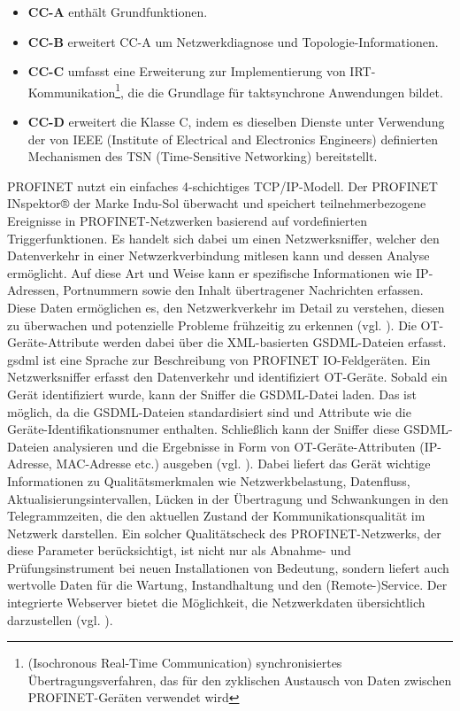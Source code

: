 \begin{itemize}
\item \textbf{CC-A} enthält Grundfunktionen.
\item \textbf{CC-B} erweitert CC-A um Netzwerkdiagnose und Topologie-Informationen.
\item \textbf{CC-C} umfasst eine Erweiterung zur Implementierung von IRT-Kommunikation\footnote{(Isochronous Real-Time Communication) synchronisiertes Übertragungsverfahren, das für den zyklischen Austausch von Daten zwischen PROFINET-Geräten verwendet wird}, die die Grundlage für taktsynchrone Anwendungen bildet.
\item \textbf{CC-D} erweitert die Klasse C, indem es dieselben Dienste unter Verwendung der von IEEE (Institute of Electrical and Electronics Engineers) definierten Mechanismen des TSN (Time-Sensitive Networking) bereitstellt.
\end{itemize} PROFINET nutzt ein einfaches 4-schichtiges TCP/IP-Modell. Der PROFINET INspektor® der Marke Indu-Sol überwacht und speichert teilnehmerbezogene Ereignisse in PROFINET-Netzwerken basierend auf vordefinierten Triggerfunktionen. Es handelt sich dabei um einen Netzwerksniffer, welcher den Datenverkehr in einer Netwzerkverbindung mitlesen kann und dessen Analyse ermöglicht.  Auf diese Art und Weise kann er spezifische Informationen wie IP-Adressen, Portnummern sowie den Inhalt übertragener Nachrichten erfassen. Diese Daten ermöglichen es, den Netzwerkverkehr im Detail zu verstehen, diesen zu überwachen und potenzielle Probleme frühzeitig zu erkennen (vgl. \cite{luber}). Die OT-Geräte-Attribute werden dabei über die XML-basierten GSDML-Dateien erfasst.  \ac{gsdml} ist eine Sprache zur Beschreibung von PROFINET IO-Feldgeräten. Ein Netzwerksniffer erfasst den Datenverkehr und identifiziert OT-Geräte. Sobald ein Gerät identifiziert wurde, kann der Sniffer die GSDML-Datei laden. Das ist möglich, da die GSDML-Dateien standardisiert sind und Attribute wie die Geräte-Identifikationsnumer enthalten. Schließlich kann der Sniffer diese GSDML-Dateien analysieren und die Ergebnisse in Form von OT-Geräte-Attributen (IP-Adresse, MAC-Adresse etc.) ausgeben (vgl. \cite{SIEMENS}). \clearpage \noindent Dabei liefert das Gerät wichtige Informationen zu Qualitätsmerkmalen wie Netzwerkbelastung, Datenfluss, Aktualisierungsintervallen, Lücken in der Übertragung und Schwankungen in den Telegrammzeiten, die den aktuellen Zustand der Kommunikationsqualität im Netzwerk darstellen. Ein solcher Qualitätscheck des PROFINET-Netzwerks, der diese Parameter berücksichtigt, ist nicht nur als Abnahme- und Prüfungsinstrument bei neuen Installationen von Bedeutung, sondern liefert auch wertvolle Daten für die Wartung, Instandhaltung und den (Remote-)Service. Der integrierte Webserver bietet die Möglichkeit, die Netzwerkdaten übersichtlich darzustellen (vgl. \cite{InduSol}).

